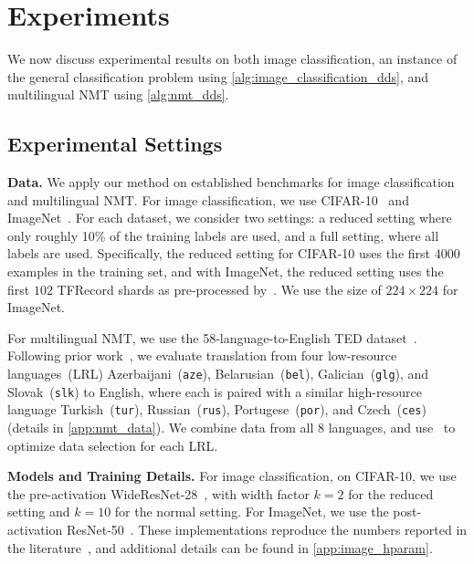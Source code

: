 \section{\label{sec:experiment}Experiments}
We now discuss experimental results on both image classification, an instance of the general classification problem using \autoref{alg:image_classification_dds}, and multilingual NMT using \autoref{alg:nmt_dds}.

\subsection{\label{exp:settings}Experimental Settings}

\noindent \textbf{Data.} We apply our method on established benchmarks for image classification and multilingual NMT.
For image classification, we use CIFAR-10~\citep{cifar10} and ImageNet~\citep{imagenet}. For each dataset, we consider two settings: a reduced setting where only roughly 10\% of the training labels are used, and a full setting, where all labels are used. Specifically, the reduced setting for CIFAR-10 uses the first $4000$ examples in the training set, and with ImageNet, the reduced setting uses the first $102$ TFRecord shards as pre-processed by~\citet{imagenet_generalize_better}. We use the size of $224 \times 224$ for ImageNet.

For multilingual NMT, we use the 58-language-to-English TED dataset~\citep{ted_pretrain_emb}. 
Following prior work~\citep{ted_pretrain_emb,rapid_adapt_nmt,sde}, we evaluate translation from four low-resource languages~(LRL) Azerbaijani~(\texttt{aze}), Belarusian~(\texttt{bel}), Galician~(\texttt{glg}), and Slovak~(\texttt{slk}) to English, where each is paired with a similar high-resource language Turkish~(\texttt{tur}), Russian~(\texttt{rus}), Portugese~(\texttt{por}), and Czech~(\texttt{ces}) (details in \autoref{app:nmt_data}).
We combine data from all 8 languages, and use \dds~to optimize data selection for each LRL. 

\noindent \textbf{Models and Training Details.}
For image classification, on CIFAR-10, we use the pre-activation WideResNet-28~\citep{wide_res_net}, with width factor $k=2$ for the reduced setting and $k=10$ for the normal setting. For ImageNet, we use the post-activation ResNet-50~\citep{res_net}. 
These implementations reproduce the numbers reported in the literature~\citep{wide_res_net,res_net,resnext}, and additional details can be found in \autoref{app:image_hparam}.


